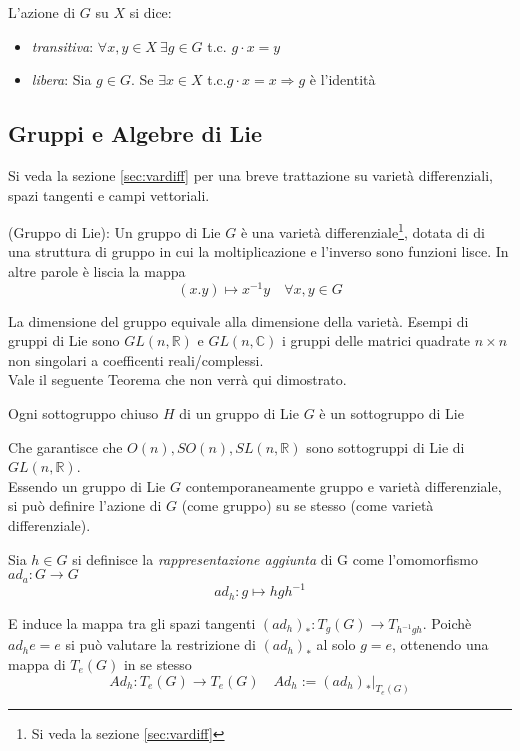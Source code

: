 L'azione di $G$ su $X$ si dice:
\begin{itemize}
   \item \emph{transitiva}: \quad $\forall x,y \in X \: \exists g \in G$ t.c. $g\cdot x = y$
   \item \emph{libera}: \quad Sia $g \in G$. Se $\exists x \in X$ t.c.$ g\cdot x = x
      \Rightarrow g$ è l'identità
\end{itemize}
\subsection{Gruppi e Algebre di Lie}
Si veda la sezione \ref{sec:vardiff} per una breve trattazione su varietà differenziali,
spazi tangenti e campi vettoriali.

\begin{definition}{(Gruppo di Lie):}
   Un gruppo di Lie $G$ è una varietà differenziale\footnote{Si veda la sezione
   \ref{sec:vardiff}}, dotata di di una struttura di gruppo in cui la
   moltiplicazione e l'inverso sono funzioni lisce. In altre parole è liscia la mappa
      $$ (x.y) \mapsto x^{-1}y \quad \forall x,y \in G$$
\end{definition}
La dimensione del gruppo equivale alla dimensione della varietà.
Esempi di gruppi di Lie sono $GL(n,\mathbb{R})$ e $GL(n,\mathbb{C})$ i gruppi
delle matrici quadrate $n \times n$ non singolari a coefficenti reali/complessi.\\
Vale il seguente Teorema che non verrà qui dimostrato.
\begin{theorem}
   Ogni sottogruppo chiuso $H$ di un gruppo di Lie $G$ è un sottogruppo di Lie
\end{theorem}
Che garantisce che $O(n), SO(n), SL(n,\mathbb{R})$ sono sottogruppi di Lie di
$GL(n,\mathbb{R})$.\\

Essendo un gruppo di Lie $G$ contemporaneamente gruppo e varietà differenziale, si
può definire l'azione di $G$ (come gruppo) su se stesso (come varietà differenziale).

\begin{definition}\label{def:adjrep}
   Sia $h \in G$ si definisce la \emph{rappresentazione aggiunta} di G come
   l'omomorfismo $ ad_a : G \to G $
   $$
      ad_h : g \mapsto h g h^{-1}
   $$
\end{definition}
E induce la mappa tra gli spazi tangenti $(ad_h)_* : T_g(G) \to T_{h^{-1}gh}$.
Poichè $ad_h e = e$ si può valutare la restrizione di $(ad_h)_*$ al solo $g=e$,
ottenendo una mappa di $T_e(G)$ in se stesso
$$
   Ad_h : T_e(G) \to T_e(G) \quad Ad_h := (ad_h)_* |_{T_e(G)}
$$

